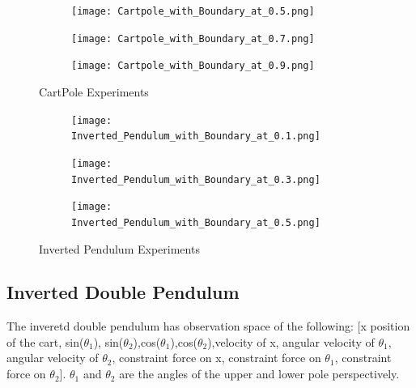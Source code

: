 \documentclass[journal]{IEEEtran}
\begin{document}
\begin{figure}
    \centering
    \captionsetup[subfigure]{font=scriptsize,labelfont=scriptsize}
    \begin{subfigure}[b]{0.5\textwidth}
      \centering
      \texttt{[image: Cartpole\_with\_Boundary\_at\_0.5.png]}
    \end{subfigure}
    \vspace*{0.0mm}
    \begin{subfigure}[b]{0.5\textwidth}
      \centering
      \texttt{[image: Cartpole\_with\_Boundary\_at\_0.7.png]}
    \end{subfigure}
    \vspace*{0.0mm}
    \begin{subfigure}[b]{0.5\textwidth}
      \centering
      \texttt{[image: Cartpole\_with\_Boundary\_at\_0.9.png]}
    \end{subfigure}
    \caption{CartPole Experiments}
    \label{fig:CartPole}
\end{figure}

\begin{figure}
    \centering
    \begin{subfigure}[b]{0.5\textwidth}
      \centering
      \texttt{[image: Inverted\_Pendulum\_with\_Boundary\_at\_0.1.png]}
    \end{subfigure}
    \vspace*{0.0mm}
    \begin{subfigure}[b]{0.5\textwidth}
      \centering
      \texttt{[image: Inverted\_Pendulum\_with\_Boundary\_at\_0.3.png]}
    \end{subfigure}
    \vspace*{0.0mm}
    \begin{subfigure}[b]{0.5\textwidth}
      \centering
      \texttt{[image: Inverted\_Pendulum\_with\_Boundary\_at\_0.5.png]}
    \end{subfigure}
    \caption{Inverted Pendulum Experiments}
    \label{fig:InvertedPendulum}
\end{figure}

\subsection{Inverted Double Pendulum}
The inveretd double pendulum has observation space of the following: [x position of the cart, sin($\theta_1$), sin($\theta_2$),cos($\theta_1$),cos($\theta_2$),velocity of x, angular velocity of $\theta_1$, angular velocity of $\theta_2$, constraint force on x, constraint force on $\theta_1$, constraint force on $\theta_2$]. $\theta_1$ and $\theta_2$ are the angles of the upper and lower pole perspectively.
\end{document}
